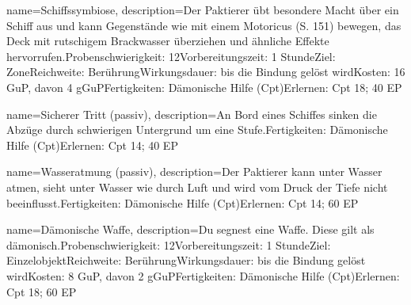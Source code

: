 {
    name={Schiffssymbiose},
    description={Der Paktierer übt besondere Macht über ein Schiff aus und kann Gegenstände wie mit einem Motoricus (S. 151) bewegen, das Deck mit rutschigem Brackwasser überziehen und ähnliche Effekte hervorrufen.\newline Probenschwierigkeit: 12\newline Vorbereitungszeit: 1 Stunde\newline Ziel: Zone\newline Reichweite: Berührung\newline Wirkungsdauer: bis die Bindung gelöst wird\newline Kosten: 16 GuP, davon 4 gGuP\newline Fertigkeiten: Dämonische Hilfe (Cpt)\newline Erlernen: Cpt 18; 40 EP}
}


{
    name={Sicherer Tritt (passiv)},
    description={An Bord eines Schiffes sinken die Abzüge durch schwierigen Untergrund um eine Stufe.\newline Fertigkeiten: Dämonische Hilfe (Cpt)\newline Erlernen: Cpt 14; 40 EP}
}


{
    name={Wasseratmung (passiv)},
    description={Der Paktierer kann unter Wasser atmen, sieht unter Wasser wie durch Luft und wird vom Druck der Tiefe nicht beeinflusst.\newline Fertigkeiten: Dämonische Hilfe (Cpt)\newline Erlernen: Cpt 14; 60 EP}
}


{
    name={Dämonische Waffe},
    description={Du segnest eine Waffe. Diese gilt als dämonisch.\newline Probenschwierigkeit: 12\newline Vorbereitungszeit: 1 Stunde\newline Ziel: Einzelobjekt\newline Reichweite: Berührung\newline Wirkungsdauer: bis die Bindung gelöst wird\newline Kosten: 8 GuP, davon 2 gGuP\newline Fertigkeiten: Dämonische Hilfe (Cpt)\newline Erlernen: Cpt 18; 60 EP}
}


